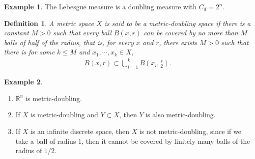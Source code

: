\documentclass[11pt]{book}
\newtheorem{definition}{Definition}[chapter]
\theoremstyle{definition}
\newtheorem{example}{Example}[chapter]
\numberwithin{equation}{chapter}
\begin{document}
\medskip

\begin{example}\label{example_51}
The Lebesgue measure is a doubling measure with $C_d = 2^n$.
\end{example}

\medskip

\begin{definition}
A metric space $X$ is said to be a metric-doubling space if there is a constant $M > 0$ such that every ball $B(x,r)$ can be covered by no more than $M$ balls of half of the radius, that is, for every $x$ and $r$, there exists $M > 0$ such that there is for some $k \leq M$ and $x_1, \cdots, x_k \in X$,
\begin{align*}
    B(x,r) \subset \bigcup^k_{i=1} B\left(x_i, \frac{r}{2}\right).
\end{align*}
\end{definition}

\medskip

\begin{example}
~\begin{enumerate}[label=(\alph*)]
    \item $\mathbb{R}^n$ is metric-doubling.
    
    \item If $X$ is metric-doubling and $Y \subset X$, then $Y$ is also metric-doubling.
    
    \item If $X$ is an infinite discrete space, then $X$ is not metric-doubling, since if we take a ball of radius $1$, then it cannot be covered by finitely many balls of the radius of $1/2$.
\end{enumerate}
\end{example}

\medskip
\end{document}
